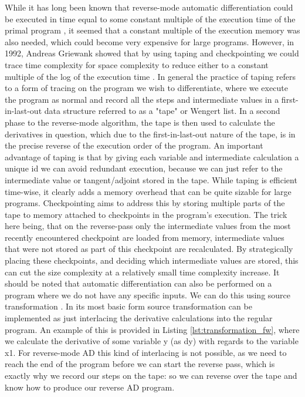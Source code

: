         While it has long been known that reverse-mode automatic differentiation could be executed in time equal to some constant multiple of the execution time of the primal program \cite{linnainmaa1976taylor}, it seemed that a constant multiple of the execution memory was also needed, which could become very expensive for large programs.
        However, in 1992, Andreas Griewank showed that by using taping and checkpointing we could trace time complexity for space complexity to reduce either to a constant multiple of the log of the execution time \cite{griewank1992achieving}.
        In general the practice of taping refers to a form of tracing on the program we wish to differentiate, where we execute the program as normal and record all the steps and intermediate values in a first-in-last-out data structure referred to as a "tape" or Wengert list.
        In a second phase to the reverse-mode algorithm, the tape is then used to calculate the derivatives in question, which due to the first-in-last-out nature of the tape, is in the precise reverse of the execution order of the program.
        An important advantage of taping is that by giving each variable and intermediate calculation a unique id we can avoid redundant execution, because we can just refer to the intermediate value or tangent/adjoint stored in the tape.
        While taping is efficient time-wise, it clearly adds a memory overhead that can be quite sizable for large programs.
        Checkpointing aims to address this by storing multiple parts of the tape to memory attached to checkpoints in the program's execution.
        The trick here being, that on the reverse-pass only the intermediate values from the most recently encountered checkpoint are loaded from memory, intermediate values that were not stored as part of this checkpoint are recalculated.
        By strategically placing these checkpoints, and deciding which intermediate values are stored, this can cut the size complexity at a relatively small time complexity increase.
        It should be noted that automatic differentiation can also be performed on a program where we do not have any specific inputs.
        We can do this using source transformation \cite{bischof2000computing}.
        In its most basic form source transformation can be implemented as just interlacing the derivative calculations into the regular program.
        An example of this is provided in Listing \ref{lst:transformation_fw}, where we calculate the derivative of some variable y (as dy) with regards to the variable x1.
        For reverse-mode AD this kind of interlacing is not possible, as we need to reach the end of the program before we can start the reverse pass, which is exactly why we record our steps on the tape: so we can reverse over the tape and know how to produce our reverse AD program.
